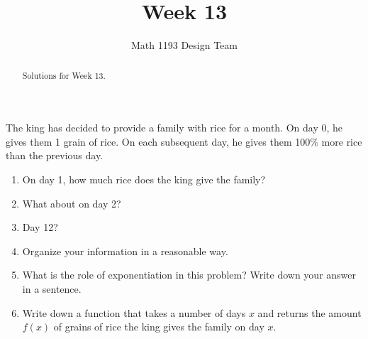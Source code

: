 \documentclass[noauthor]{ximera}
\title{Week 13}
\author{Math 1193 Design Team}
\begin{document}
\begin{abstract}
    Solutions for Week 13.
\end{abstract}
\maketitle

\begin{problem}
The king has decided to provide a family with rice for a month. 
On day 0, he gives them 1 grain of rice. On each subsequent day, 
he gives them 100\% more rice than the previous day. 

\begin{enumerate}
    \item On day 1, how much rice does the king give the family?
    \item What about on day 2?
    \item Day 12?
    \item Organize your information in a reasonable way.
    \item What is the role of exponentiation in this problem? Write down
    your answer in a sentence.
    \item Write down a function that takes a number of days \(x\)
    and returns the amount \(f(x)\) of grains of rice the king gives the
    family on day \(x\).
\end{enumerate}


\end{problem}
\end{document}
